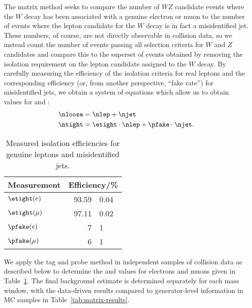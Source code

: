 The matrix method seeks to compare the number \nlep of $WZ$ candidate events where the $W$ decay has been associated with a genuine electron or muon to the number \njet of events where the lepton candidate for the $W$ decay is in fact a misidentified jet.  These numbers, of course, are not directly observable in collision data, so we instead count the number \ntight of events passing all selection criteria for $W$ and $Z$ candidates and compare this to the superset of events \nloose obtained by removing the isolation requirement on the lepton candidate assigned to the $W$ decay.  By carefully measuring the efficiency \etight of the isolation criteria for real leptons and the corresponding efficiency (or, from another perspective, ``fake rate'') \pfake for misidentified jets, we obtain a system of equations which allow us to obtain values for \nlep{} and \njet:
\begin{align}
  \nloose &= \nlep + \njet \\
  \ntight &= \etight\cdot\nlep + \pfake\cdot\njet.
\end{align}

\begin{table}
  \centering
  \newcommand{\ph}{}
  \begin{tabular}{l r@{$\,\pm\,$}l}
    \toprule
    Measurement & \multicolumn{2}{c}{Efficiency/\%} \\
    \midrule
    $\etight(e)$   & 93.59 & 0.04 \\
    $\etight(\mu)$ & 97.11 & 0.02 \\
    $\pfake(e)$    &  7\ph & 1\ph \\
    $\pfake(\mu)$  &  6\ph & 1\ph \\
    \bottomrule
  \end{tabular}
  \caption{Measured isolation efficiencies for genuine leptons and misidentified jets.}
  \label{tab:efficiencies}
\end{table}

We apply the tag and probe method in independent samples of collision data as described below to determine the \etight{} and \pfake{} values for electrons and muons given in Table~\ref{tab:efficiencies}.  The final background estimate is determined separately for each mass window, with the data-driven results compared to generator-level information in MC samples in Table~\ref{tab:matrix-results}.

